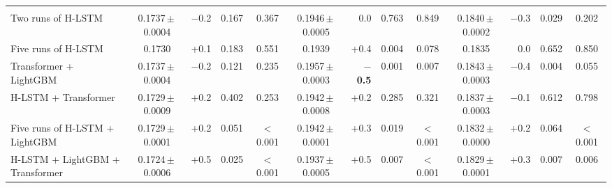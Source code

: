 \begin{tabular}{@{}lcrcccrcccrcc@{}}
\addlinespace[2pt]
\multicolumn{13}{@{}l}{\emph{Other averages}} \\
Two runs of H-LSTM & 0.1737\,$\pm$\,0.0004 & $-$0.2 & 0.167 & 0.367 & 0.1946\,$\pm$\,0.0005 & 0.0 & 0.763 & 0.849 & 0.1840\,$\pm$\,0.0002 & $-$0.3 & 0.029 & 0.202 \\
Five runs of H-LSTM & 0.1730 & +0.1 & 0.183 & 0.551 & 0.1939 & +0.4 & 0.004 & 0.078 & 0.1835 & 0.0 & 0.652 & 0.850 \\
Transformer + LightGBM & 0.1737\,$\pm$\,0.0004 & $-$0.2 & 0.121 & 0.235 & 0.1957\,$\pm$\,0.0003 & \textbf{$-$0.5} & 0.001 & 0.007 & 0.1843\,$\pm$\,0.0003 & $-$0.4 & 0.004 & 0.055 \\
H-LSTM + Transformer & 0.1729\,$\pm$\,0.0009 & +0.2 & 0.402 & 0.253 & 0.1942\,$\pm$\,0.0008 & +0.2 & 0.285 & 0.321 & 0.1837\,$\pm$\,0.0003 & $-$0.1 & 0.612 & 0.798 \\
Five runs of H-LSTM + LightGBM & 0.1729\,$\pm$\,0.0001 & +0.2 & 0.051 & $<$0.001 & 0.1942\,$\pm$\,0.0001 & +0.3 & 0.019 & $<$0.001 & 0.1832\,$\pm$\,0.0000 & +0.2 & 0.064 & $<$0.001 \\
H-LSTM + LightGBM + Transformer & 0.1724\,$\pm$\,0.0006 & +0.5 & 0.025 & $<$0.001 & 0.1937\,$\pm$\,0.0005 & +0.5 & 0.007 & $<$0.001 & 0.1829\,$\pm$\,0.0001 & +0.3 & 0.007 & 0.006 \\
\bottomrule
\end{tabular}
